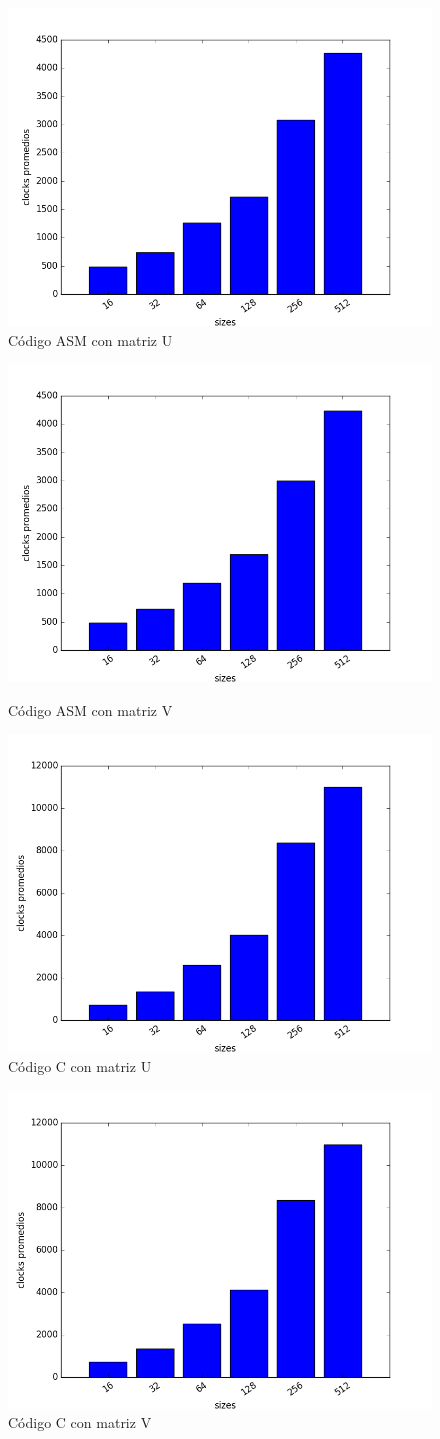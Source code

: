 \begin{figure}[h]
  \centering
    \includegraphics[width=.6\linewidth]{ClocksASMU.png}
    \caption{Código ASM con matriz U}
    \label{fig:ASMU}
\end{figure}

\pagebreak

\begin{figure}[h]
  \centering
    \includegraphics[width=.6\linewidth]{ClocksASMV.png}
    \caption{Código ASM con matriz V}
    \label{fig:ASMV}
  \centering
    \includegraphics[width=.6\linewidth]{ClocksCU.png}
    \caption{Código C con matriz U}
    \label{fig:CU}
\end{figure}

\begin{figure}[h]
  \centering
    \includegraphics[width=.6\linewidth]{ClocksCV.png}
    \caption{Código C con matriz V}
    \label{fig:CV}
\end{figure}

